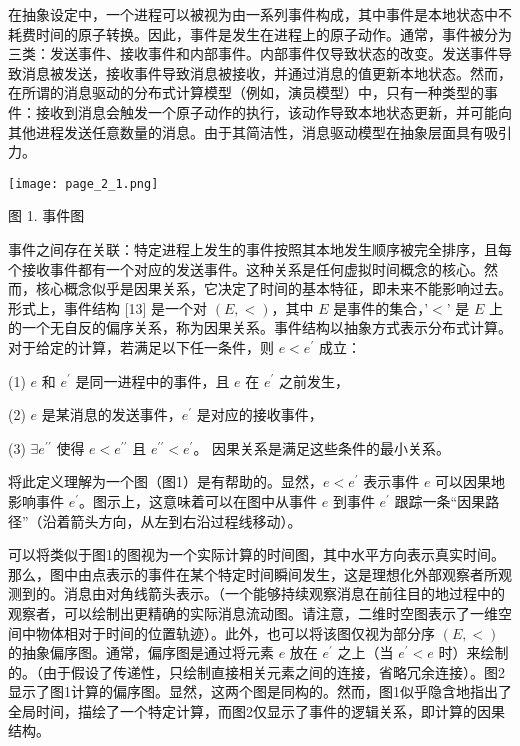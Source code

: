 \documentclass[12pt,a4paper]{report} %
\begin{document}
在抽象设定中，一个进程可以被视为由一系列事件构成，其中事件是本地状态中不耗费时间的原子转换。因此，事件是发生在进程上的原子动作。通常，事件被分为三类：发送事件、接收事件和内部事件。内部事件仅导致状态的改变。发送事件导致消息被发送，接收事件导致消息被接收，并通过消息的值更新本地状态。然而，在所谓的消息驱动的分布式计算模型（例如，演员模型）中，只有一种类型的事件：接收到消息会触发一个原子动作的执行，该动作导致本地状态更新，并可能向其他进程发送任意数量的消息。由于其简洁性，消息驱动模型在抽象层面具有吸引力。

\begin{center}
\texttt{[image: page\_2\_1.png]}
\end{center}
\begin{center}
图 1. 事件图
\end{center}

事件之间存在关联：特定进程上发生的事件按照其本地发生顺序被完全排序，且每个接收事件都有一个对应的发送事件。这种关系是任何虚拟时间概念的核心。然而，核心概念似乎是因果关系，它决定了时间的基本特征，即未来不能影响过去。形式上，事件结构 [13] 是一个对 $(E,<)$，其中 $E$ 是事件的集合，'$<$' 是 $E$ 上的一个无自反的偏序关系，称为因果关系。事件结构以抽象方式表示分布式计算。对于给定的计算，若满足以下任一条件，则 $e<e^{\prime}$ 成立：

(1) $e$ 和 $e^{\prime}$ 是同一进程中的事件，且 $e$ 在 $e^{\prime}$ 之前发生，

(2) $e$ 是某消息的发送事件，$e^{\prime}$ 是对应的接收事件，

(3) $\exists e^{\prime \prime}$ 使得 $e<e^{\prime \prime}$ 且 $e^{\prime \prime}<e^{\prime}$。
因果关系是满足这些条件的最小关系。

将此定义理解为一个图（图1）是有帮助的。显然，$e<e^{\prime}$ 表示事件 $e$ 可以因果地影响事件 $e^{\prime}$。图示上，这意味着可以在图中从事件 $e$ 到事件 $e^{\prime}$ 跟踪一条“因果路径”（沿着箭头方向，从左到右沿过程线移动）。

可以将类似于图1的图视为一个实际计算的时间图，其中水平方向表示真实时间。那么，图中由点表示的事件在某个特定时间瞬间发生，这是理想化外部观察者所观测到的。消息由对角线箭头表示。（一个能够持续观察消息在前往目的地过程中的观察者，可以绘制出更精确的实际消息流动图。请注意，二维时空图表示了一维空间中物体相对于时间的位置轨迹）。此外，也可以将该图仅视为部分序 $(E,<)$ 的抽象偏序图。通常，偏序图是通过将元素 $e$ 放在 $e^{\prime}$ 之上（当 $e^{\prime}<e$ 时）来绘制的。（由于假设了传递性，只绘制直接相关元素之间的连接，省略冗余连接）。图2显示了图1计算的偏序图。显然，这两个图是同构的。然而，图1似乎隐含地指出了全局时间，描绘了一个特定计算，而图2仅显示了事件的逻辑关系，即计算的因果结构。
\end{document}
